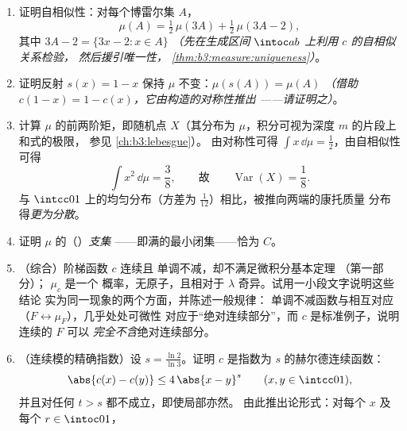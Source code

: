 \begin{problem}
\begin{enumerate}[resume]
        （$2^m$ 个深度为 $m$ 的康托片段之一）。证明
        $\mu(C_\varepsilon) = 2^{-m}$ \emph{（阶梯函数在此片段上
        升高 $2^{-m}$：利用第一部分
        第 3 题）}。康托是以三进制读取的
        无穷公平掷硬币序列的分布
——\cref{ch:b3:probability} 将使此事精确化。
  \item 证明自相似性：对每个博雷尔集 $A$，
        \[
        \mu(A) = \tfrac12\,\mu(3A) +
        \tfrac12\,\mu(3A - 2) ,
        \]
        其中 $3A - 2 = \{3x - 2 : x \in A\}$ \emph{（先在生成区间
        $\intoc ab$ 上利用 $c$ 的自相似关系检验，
        然后援引唯一性，
        \cref{thm:b3:measure:uniqueness}）}。
  \item 证明反射 $s(x) = 1 - x$ 保持
        $\mu$ 不变：$\mu(s(A)) = \mu(A)$ \emph{（借助 $c(1 - x) = 1 -
        c(x)$，它由构造的对称性推出
——请证明之）}。
  \item 计算 $\mu$ 的前两阶矩，即随机点 $X$（其分布为
        $\mu$，积分可视为深度 $m$ 的片段上和式的极限，
        参见 \cref{ch:b3:lebesgue}）。
        由对称性可得
        $\int x\,\dd\mu = \frac12$，由自相似性可得
        \[
        \int x^2\,\dd\mu = \frac38,
        \qquad\text{故}\qquad
        \operatorname{Var}(X) = \frac18 .
        \]
        与 $\intcc01$ 上的均匀分布（方差为
        $\frac1{12}$）相比，被推向两端的康托质量
        分布得\emph{更为分散}。
  \item 证明 $\mu$ 的（）\emph{支集}
——即满的最小闭集——恰为
        $C$。
  \item （综合）阶梯函数 $c$ 连续且
        单调不减，却不满足微积分基本定理
        （第一部分）； $\mu_c$ 是一个
        概率，无原子，且相对于
        $\lambda$ 奇异。试用一小段文字说明这些结论
        实为同一现象的两个方面，并陈述一般规律：
        单调不减函数与相互对应
        （$F \leftrightarrow \mu_F$），几乎处处可微性
        对应于“绝对连续部分”，而
        $c$ 是标准例子，说明连续的 $F$ 可以
        \emph{完全不含}绝对连续部分。
  \item （连续模的精确指数）设 $s =
        \frac{\ln 2}{\ln 3}$。证明 $c$ 是指数为 $s$
        的赫尔德连续函数：
        \[
        \abs{c(x) - c(y)} \leq 4\,\abs{x - y}^{s}
        \qquad (x, y \in \intcc01),
        \]
        并且对任何 $t > s$ 都不成立，即使局部亦然。
        由此推出论形式：对每个 $x$ 及
        每个 $r \in \intoc01$，
        \[
\]
\end{enumerate}
\end{problem}
